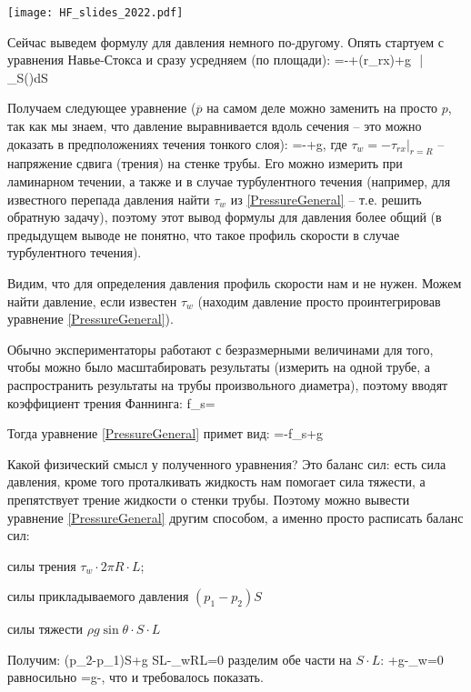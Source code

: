 \documentclass[main.tex]{subfiles}
\begin{document}
\texttt{[image: HF\_slides\_2022.pdf]}

Сейчас выведем формулу для давления немного по-другому.
Опять стартуем с уравнения Навье-Стокса и сразу усредняем (по площади):
=-+\left(r\tau_{rx}\right)+\rho g \sin{\theta}\,\,\bigg|\,\,\,\,\,\int\limits_S(\cdot)dS
\eeq

Получаем следующее уравнение ($\overline{p}$ на самом деле можно заменить на просто $p$, так как мы знаем, что давление выравнивается вдоль сечения -- это можно доказать в предположениях течения тонкого слоя):
\beq\label{PressureGeneral}
=-+\overline{\rho}g\sin{\theta},
\eeq
где $\tau_w=-\tau_{rx}|_{r=R}$ -- напряжение сдвига (трения) на стенке трубы.
Его можно измерить при ламинарном течении, а также и в случае турбулентного течения (например, для известного перепада давления найти $\tau_w$ из \eqref{PressureGeneral} -- т.е. решить обратную задачу), поэтому этот вывод формулы для давления более общий (в предыдущем выводе не понятно, что такое профиль скорости в случае турбулентного течения).

Видим, что для определения давления профиль скорости нам и не нужен.
Можем найти давление, если известен $\tau_w$ (находим давление просто проинтегрировав уравнение \eqref{PressureGeneral}).

Обычно экспериментаторы работают с безразмерными величинами для того, чтобы можно было масштабировать результаты (измерить на одной трубе, а распространить результаты на трубы произвольного диаметра), поэтому вводят коэффициент трения Фаннинга:
\beq
f_s=
\eeq

Тогда уравнение \eqref{PressureGeneral} примет вид:
\beq
{}=-f_s+\rho g\sin{\theta}
\eeq

Какой физический смысл у полученного уравнения?
Это баланс сил: есть сила давления, кроме того проталкивать жидкость нам помогает сила тяжести, а препятствует трение жидкости о стенки трубы.
Поэтому можно вывести уравнение \eqref{PressureGeneral} другим способом, а именно просто расписать баланс сил:

силы трения $\tau_w\cdot2\pi R\cdot L$;

силы прикладываемого давления $\left(p_1-p_2\right)S$

силы тяжести $\rho g\sin{\theta} \cdot S\cdot L$

Получим:
\beq
\left(p_2-p_1\right)S+\rho g\sin{\theta} \cdot S\cdot L-\tau_w\pi R\cdot L=0
\eeq
разделим обе части на $S\cdot L$:
\beq
{}+\rho g\sin{\theta}-\tau_w\cdot{}=0
\eeq
равносильно
\beq
{}=\rho g\sin{\theta}-,
\eeq
что и требовалось показать.
\\
\end{document}
